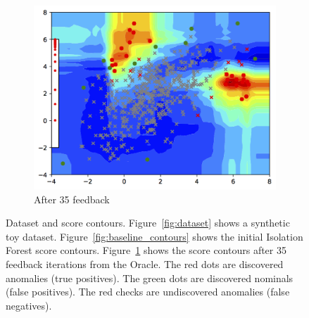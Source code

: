 \documentclass{article} %
\begin{document}
\begin{figure}
	\begin{subfigure}[b]{0.3\textwidth}
		\includegraphics[width=\textwidth]{toy2_iter_34}
		\caption{After 35 feedback}
		\label{fig:contours_35}
	\end{subfigure}
	\caption{Dataset and score contours. Figure~\ref{fig:dataset} shows a synthetic toy dataset. Figure~\ref{fig:baseline_contours} shows the initial Isolation Forest score contours. Figure~\ref{fig:contours_35} shows the score contours after 35 feedback iterations from the Oracle. The red dots are discovered anomalies (true positives). The green dots are discovered nominals (false positives). The red checks are undiscovered anomalies (false negatives).} \label{fig:dataset_and_contours}
\end{figure}
\end{document}
